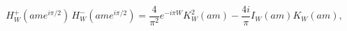 \begin{equation}
\label{Eq_0225}
H^{+}_W(ame^{i\pi/2}) \, H^{-}_W(ame^{i\pi/2})
  = \frac{4}{\pi^2} e^{-i\pi W} K^2_W (am) - \frac{4i}{\pi} I_W(am) K_W(am), 
\end{equation}


